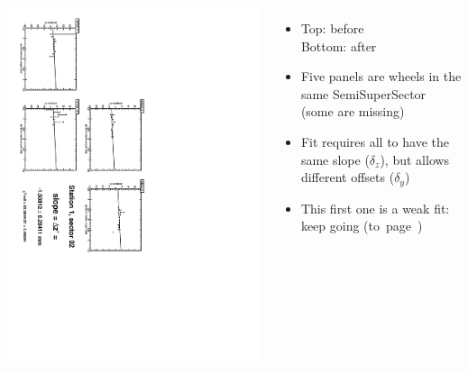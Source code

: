 \documentclass[compress]{beamer}
\begin{document}
\begin{frame}
\begin{columns}
\vfill
\includegraphics[height=\linewidth, angle=90]{zfits_after/zfit_1_02.pdf}
\begin{itemize}
\item Top: before \\ Bottom: after
\item Five panels are wheels in the same SemiSuperSector (some are missing)
\item Fit requires all to have the same slope ($\delta_z$), but allows different offsets ($\delta_y$)
\item This first one is a weak fit: keep going \mbox{(to page~\pageref{after})\hspace{-1 cm}}
\end{itemize}
\end{columns}
\end{frame}
\end{document}
